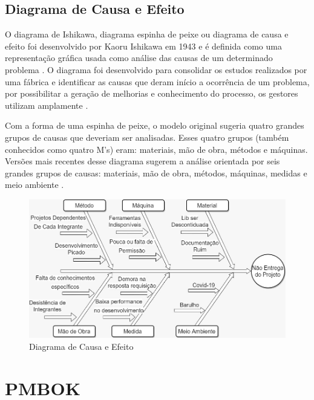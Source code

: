 \subsection{Diagrama de Causa e Efeito}

O diagrama de Ishikawa, diagrama espinha de peixe ou diagrama de causa e efeito foi desenvolvido por Kaoru Ishikawa em 1943 e é definida como uma representação gráfica usada como análise das causas de um determinado problema \cite{santos2017planos}.
O diagrama foi desenvolvido para consolidar os estudos realizados por uma fábrica e identificar as causas que deram início a ocorrência de um problema, por possibilitar a geração de melhorias e conhecimento do processo, os gestores utilizam amplamente \cite{ribeiro2017definiccao}.

Com a forma de uma espinha de peixe, o modelo original sugeria quatro grandes grupos de causas que deveriam ser analisadas. Esses quatro grupos (também conhecidos como quatro M's) eram: materiais, mão de obra, métodos e máquinas. Versões mais recentes desse diagrama sugerem a análise orientada por seis grandes grupos de causas: materiais, mão de obra, métodos, máquinas, medidas e meio ambiente \cite{selner1999analise}.

\begin{landscape}
	\begin{figure}[htb]
		\caption{\label{causaeefeito1}Diagrama de Causa e Efeito}
		\begin{center}
			\includegraphics[scale=0.80]{./Figuras/Diagrama causa e efeito.jpeg}
		\end{center}
	\end{figure}
\end{landscape}

\section{PMBOK}

